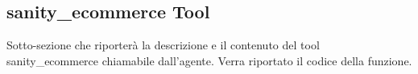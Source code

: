 \subsection{sanity\_ecommerce Tool}

Sotto-sezione che riporterà la descrizione e il contenuto del tool sanity\_ecommerce chiamabile dall'agente.
Verra riportato il codice della funzione.
